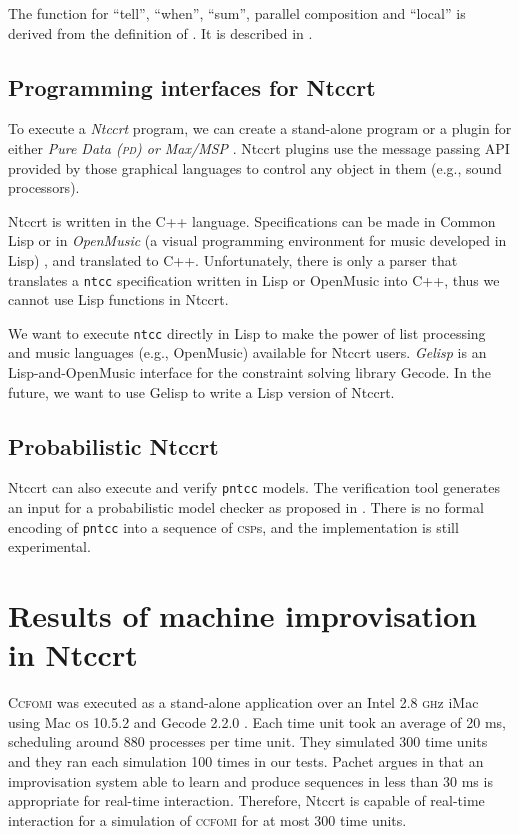 \documentclass[english]{llncs}
\begin{document}
The function  for ``tell'', ``when'', ``sum'', parallel composition and ``local'' is derived from the definition of . It is described in \cite{toro-report09}.

\subsection{Programming interfaces for Ntccrt}
To execute a \textit{Ntccrt} program, we can create a stand-alone program or a plugin for either \textit{Pure Data (\textsc{pd}) or Max/MSP} \cite{maxpd}. 
Ntccrt plugins use the message passing API provided by those graphical languages to control any object in them (e.g., sound processors).

Ntccrt is written in the C++ language. Specifications can be made in Common Lisp 
 or in \textit{OpenMusic}  (a visual programming environment for music developed in Lisp) \cite{agon98}, and translated to C++. Unfortunately, there is only a parser that translates a \texttt{ntcc} specification written in Lisp or OpenMusic into C++, thus 
we cannot use Lisp functions in Ntccrt.

We want to execute \texttt{ntcc} directly in Lisp to make the power
of list processing and music languages (e.g., OpenMusic) available for Ntccrt users.
\textit{Gelisp} \cite{toro-report09a} is an Lisp-and-OpenMusic interface for the constraint solving library Gecode. In the future, we want to use Gelisp to write a Lisp version of Ntccrt.

\subsection{Probabilistic Ntccrt}
Ntccrt can also execute and verify \texttt{pntcc} models. The verification tool generates an input for a probabilistic model checker as proposed in \cite{perez09}. There is no formal encoding of \texttt{pntcc} into a sequence of \textsc{csp}s, and the implementation is still experimental.



\section{Results of machine improvisation in Ntccrt}


\textsc{Ccfomi} was executed as a stand-alone application over an Intel 2.8 \textsc{gh}z iMac using
Mac \textsc{os} 10.5.2 and Gecode 2.2.0 \cite{toro08}. Each time unit took an average of 20 ms, scheduling
around 880 processes per time unit. They simulated 300 time units and they ran each simulation 100 times in our tests.
Pachet argues in \cite{pachet02} that an improvisation system able to learn and produce sequences in less than 30 ms is appropriate for real-time interaction.
Therefore, Ntccrt is capable of real-time interaction for a simulation of \textsc{ccfomi} for at most 300 time units.
\end{document}
